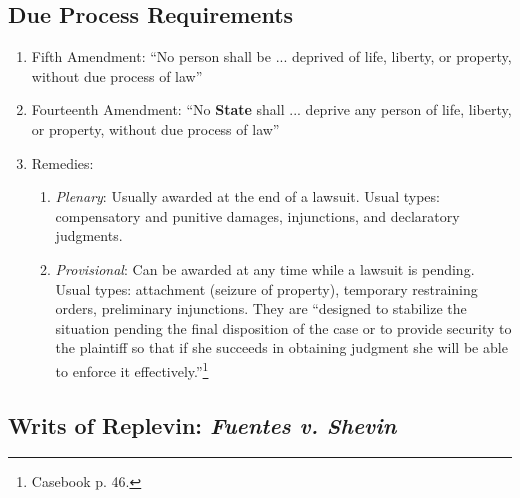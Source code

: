 \subsection{Due Process Requirements}

\begin{enumerate}
    \item Fifth Amendment: ``No person shall be ... deprived of life, liberty, 
    or property, without due process of law''
    \item Fourteenth Amendment: ``No \textbf{State} shall ... deprive any 
    person of life, liberty, or property, without due process of law''
    \item Remedies:
    \begin{enumerate}
        \item \emph{Plenary}: Usually awarded at the end of a lawsuit. Usual 
        types: compensatory and punitive damages, injunctions, and declaratory 
        judgments.
        \item \emph{Provisional}: Can be awarded at any time while a lawsuit 
        is pending. Usual types: attachment (seizure of property), temporary 
        restraining orders, preliminary injunctions. They are ``designed to 
        stabilize the situation pending the final disposition of the case or 
        to provide security to the plaintiff so that if she succeeds in 
        obtaining judgment she will be able to enforce it 
        effectively.''\footnote{Casebook p. 46.}
    \end{enumerate}
\end{enumerate}

\subsection{Writs of Replevin: \emph{Fuentes v. Shevin}}

